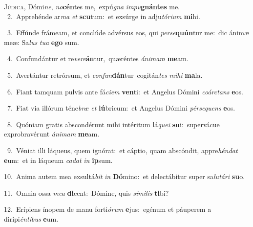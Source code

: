 \lettrine{\initial\textcolor{\initialcolor}{J}}{údica,} Dómi\-\textit{ne}\-, \textit{no}\-\textbf{cén}tes me,~\star expú\textit{gna} \textit{im}\-\textit{pu}\textbf{gnán}\textbf{tes} me.\\
{\numbfont\textcolor{\numbcolor}{~2.}}~Apprehénde ar\textit{ma} \textit{et} \textbf{scu}\-tum:~\star et exsúrge in adju\-\textit{tó}\-\textit{ri}\textit{um} \textbf{mi}\-hi.\par
{\numbfont\textcolor{\numbcolor}{~3.}}~Effúnde frámeam, et conclúde advérsus eos, qui \textit{per}\-\textit{se}\textbf{quún}tur me:~\star dic ánimæ meæ: Sa\textit{lus} \textit{tu}\-\textit{a} \textbf{e}\-\textbf{go} sum.\par
{\numbfont\textcolor{\numbcolor}{~4.}}~Confundántur et re\-\textit{ve}\-\textit{re}\textbf{án}tur,~\star quæréntes \textit{á}\-\textit{ni}\textit{mam} \textbf{me}\-am.\par
{\numbfont\textcolor{\numbcolor}{~5.}}~Avertántur retrórsum, et \textit{con}\-\textit{fun}\textbf{dán}tur~\star cogitán\textit{tes} \textit{mi}\-\textit{hi} \textbf{ma}\-la.\par
{\numbfont\textcolor{\numbcolor}{~6.}}~Fiant tamquam pulvis ante fá\-\textit{ci}\-\textit{em} \textbf{ven}\-ti:~\star et Angelus Dómini \textit{co}\-\textit{árc}\textit{tans} \textbf{e}\-os.\par
{\numbfont\textcolor{\numbcolor}{~7.}}~Fiat via illórum téne\textit{bræ} \textit{et} \textbf{lú}\-bricum:~\star et Angelus Dómini \textit{pér}\-\textit{se}\textit{quens} \textbf{e}\-os.\par
{\numbfont\textcolor{\numbcolor}{~8.}}~Quóniam gratis abscondérunt mihi intéritum lá\-\textit{que}\-\textit{i} \textbf{su}\-i:~\star supervácue exprobravérunt \textit{á}\-\textit{ni}\textit{mam} \textbf{me}\-am.\par
{\numbfont\textcolor{\numbcolor}{~9.}}~Véniat illi láqueus, quem ignórat:~\dagger et cáptio, quam abscóndit, appre\-\textit{hén}\-\textit{dat} \textbf{e}\-um:~\star et in láqueum \textit{ca}\-\textit{dat} \textit{in} \textbf{ip}\-sum.\par
{\numbfont\textcolor{\numbcolor}{10.}}~Anima autem mea exsultá\textit{bit} \textit{in} \textbf{Dó}\-mino:~\star et delectábitur super sa\-\textit{lu}\-\textit{tá}\textit{ri} \textbf{su}\-o.\par
{\numbfont\textcolor{\numbcolor}{11.}}~Omnia ossa \textit{me}\-\textit{a} \textbf{di}\-cent:~\star Dómine, quis \textit{sí}\-\textit{mi}\textit{lis} \textbf{ti}\-bi?\par
{\numbfont\textcolor{\numbcolor}{12.}}~Erípiens ínopem de manu forti\-\textit{ó}\-\textit{rum} \textbf{e}\-jus:~\star egénum et páuperem a diripi\-\textit{én}\-\textit{ti}\textit{bus} \textbf{e}\-um.\par
